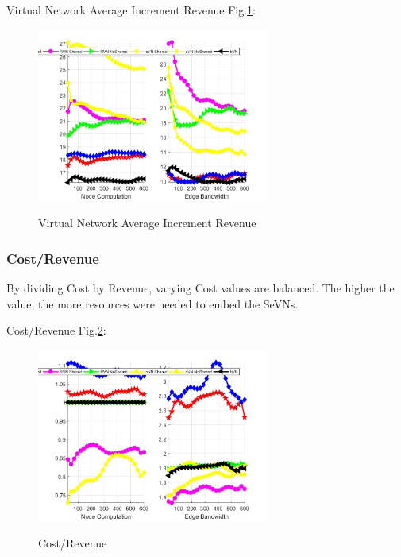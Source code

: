 Virtual Network Average Increment Revenue Fig.\ref{fig:RevenueAccumulateAverageVirtualNetwork}:
\begin{figure}
  \centering
  \includegraphics[width=3in]{Fig/RevenueAccumulateAverageVirtualNetwork}\\
  \caption{Virtual Network Average Increment Revenue}\label{fig:RevenueAccumulateAverageVirtualNetwork}
\end{figure}


\subsubsection{Cost/Revenue}
By dividing Cost by Revenue, varying Cost values are balanced. The higher the value, the more resources were needed to embed the SeVNs.

Cost/Revenue Fig.\ref{fig:CostRevenue}:
\begin{figure}
  \centering
  \includegraphics[width=3in]{Fig/CostRevenue}\\
  \caption{Cost/Revenue}\label{fig:CostRevenue}
\end{figure}

